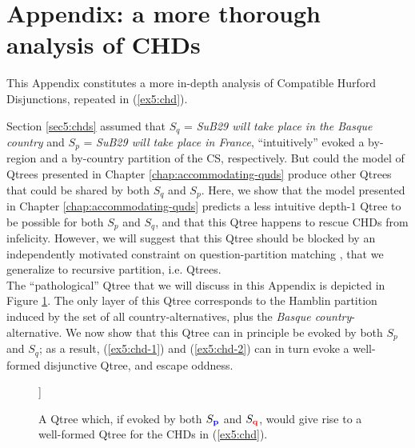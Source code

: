 \section{Appendix: a more thorough analysis of CHDs}\label{apdx5:chds}

This Appendix constitutes a more in-depth analysis of Compatible Hurford Disjunctions, repeated in (\ref{ex5:chd}). 

\begin{exe}
	\begin{xlist}
	\end{xlist}
\end{exe} 

Section \ref{sec5:chds} assumed that $S_q$ = \textit{SuB29 will take place in the Basque country} and $S_p$ = \textit{SuB29 will take place in France}, ``intuitively'' evoked a by-region and a by-country partition of the CS, respectively. But could the model of Qtrees presented in Chapter \ref{chap:accommodating-quds} produce other Qtrees that could be shared by both $S_q$ and $S_p$. Here, we show that the model presented in Chapter \ref{chap:accommodating-quds} predicts a less intuitive depth-$1$ Qtree to be possible for both $S_p$ and $S_q$, and that this Qtree happens to rescue CHDs from infelicity. However, we will suggest that this Qtree should be blocked by an independently motivated constraint on question-partition matching \parencite{Fox2018}, that we generalize to recursive partition, i.e. Qtrees.\\


The ``pathological'' Qtree that we will discuss in this Appendix is depicted in Figure \ref{fig5:qtree-tentative-chd}. The only layer of this Qtree corresponds to the Hamblin partition induced by the set of all country-alternatives, plus the \textit{Basque country}-alternative. We now show that this Qtree can in principle be evoked by both $S_{p}$ and $S_{q}$; as a result, (\ref{ex5:chd-1}) and (\ref{ex5:chd-2}) can in turn evoke a well-formed disjunctive Qtree, and escape oddness.

\begin{figure}[H]
	\centering
	\begin{forest}
		[CS[{\textcolor{blue}{France}$\wedge$\textcolor{red}{Basque}}][{\textcolor{blue}{Spain}$\wedge$\textcolor{red}{Basque}}][{\textcolor{blue}{France}$\wedge\neg$\textcolor{red}{Basque}}][{\textcolor{blue}{Spain}$\wedge\neg$\textcolor{red}{Basque}}][...]]
	\end{forest}
	\caption[]{A Qtree which, if evoked by both $S_{\textbf{\textcolor{blue}{p}}}$ and $S_{\textbf{\textcolor{red}{q}}}$, would give rise to a well-formed Qtree for the CHDs in (\ref{ex5:chd}).}\label{fig5:qtree-tentative-chd}
\end{figure}

